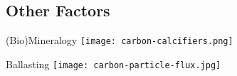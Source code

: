 \documentclass[aspectratio=169]{beamer}
\begin{document}
\subsection{Other Factors}

\begin{frame}{(Bio)Mineralogy}
    \centering
    \texttt{[image: carbon-calcifiers.png]}

\end{frame}

\begin{frame}{Ballasting}
    \centering
    \texttt{[image: carbon-particle-flux.jpg]}

\end{frame}
\end{document}
